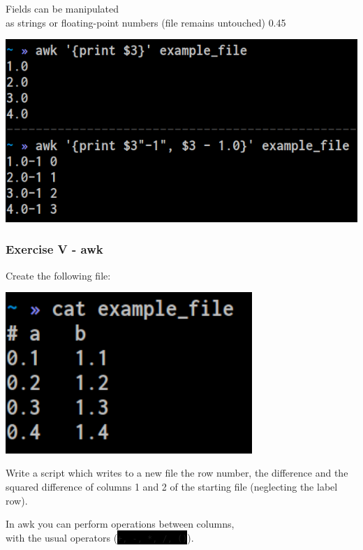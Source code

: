 \documentclass[unknownkeysallowed, 10pt, a4 paper, handout]{beamer}
\newcommand{\code}[1]{\colorbox{black}{\color{green}\texttt{#1}}}
\newcommand{\sidebyside}[5]{
  \begin{minipage}{#1\textwidth}
    #2
  \end{minipage} #3 \begin{minipage}{#4\textwidth}
    #5
  \end{minipage}
}
\begin{document}
\begin{frame}
\begin{center}
{      Fields can be manipulated\\
      as strings or floating-point numbers
      (file remains untouched)
    }{\hfill}{0.45}{
      \begin{center}
        \includegraphics[width=1.00\textwidth]{pics/awk-2.png}
      \end{center}
    }
  \end{center}
\end{frame}

\begin{frame}
  \begin{center}
    \frametitle{Exercise V - awk}

    \sidebyside{0.35}{
      Create the following file:
    }{\hfill}{0.60}{
      \begin{center}
        \includegraphics[width=0.70\textwidth]{pics/ex_5.png}
      \end{center}
    }

    \vspace{4mm}

    Write a script which writes to a new file the row number, the difference
    and the squared difference of columns 1 and 2 of the starting file
    (neglecting the label row).

    \vspace{4mm}

    In awk you can perform operations between columns,\\
    with the usual operators (\code{+, -, *, /, ()}).
  \end{center}
\end{frame}
\end{document}
